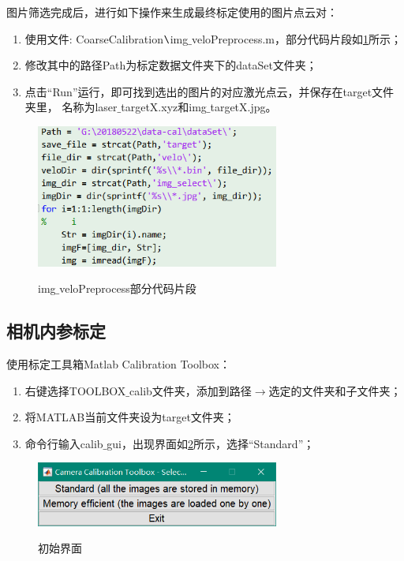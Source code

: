 图片筛选完成后，进行如下操作来生成最终标定使用的图片点云对：
\begin{enumerate}[$\star$]
\item 使用文件: CoarseCalibration$\verb|\|$img$\_$veloPreprocess.m，部分代码片段如\figurename\ref{fig: pic5}所示；
\item 修改其中的路径Path为标定数据文件夹下的dataSet文件夹；
\item 点击“Run”运行，即可找到选出的图片的对应激光点云，并保存在target文件夹里，
名称为laser$\_$targetX.xyz和img$\_$targetX.jpg。
\end{enumerate}

\begin{figure}[htbp]
	\centering
    \includegraphics[width=8cm]{pic/5.png} \\
	\caption{img$\_$veloPreprocess部分代码片段}\label{fig: pic5}
\end{figure}


\subsection{相机内参标定}
使用标定工具箱Matlab Calibration Toolbox：
\begin{enumerate}[$\star$]
\item 右键选择TOOLBOX$\_$calib文件夹，添加到路径$\rightarrow$选定的文件夹和子文件夹；
\item 将MATLAB当前文件夹设为target文件夹；
\item 命令行输入calib$\_$gui，出现界面如\figurename\ref{fig: pic6}所示，选择“Standard”；
\end{enumerate}

\begin{figure}[htbp]
	\centering
    \includegraphics[width=8cm]{pic/6.png} \\
	\caption{初始界面}\label{fig: pic6}
\end{figure}

